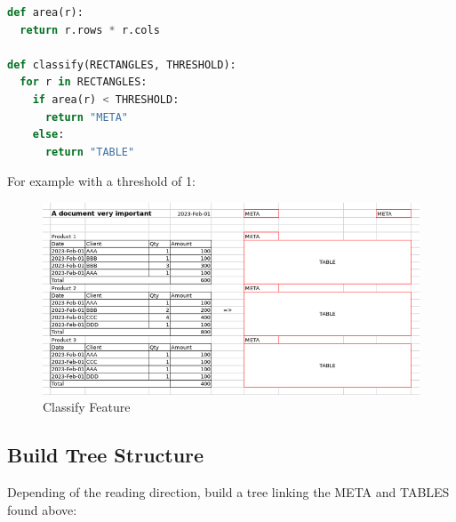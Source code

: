 \documentclass{article}
\begin{document}
\begin{lstlisting}[language=Python, caption=Spreadsheet To Bitmap]
def area(r):
  return r.rows * r.cols

def classify(RECTANGLES, THRESHOLD):
  for r in RECTANGLES:
    if area(r) < THRESHOLD:
      return "META"
    else:
      return "TABLE"
\end{lstlisting}

For example with a threshold of 1:

\begin{figure}[H]
\caption{Classify Feature}
\includegraphics[width=\columnwidth]{classify_features}
\end{figure}

\subsection{Build Tree Structure}
Depending of the reading direction, build a tree linking the META and TABLES found above:
\end{document}
